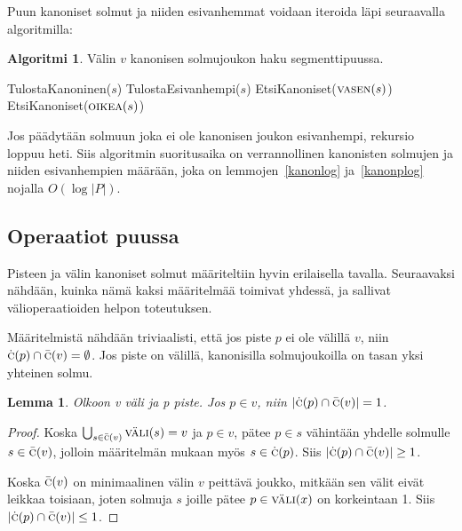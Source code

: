 \documentclass[finnish]{tktltiki2}
\newtheorem{lem}[lau]{Lemma}
\theoremstyle{definition}
\newtheorem{alg}[lau]{Algoritmi}
\theoremstyle{remark}
\newcommand\size[1]{\ensuremath{\left |#1\right |}\xspace}
\newcommand\epts{\ensuremath{P}\xspace}
\newcommand\inter[1]{\ensuremath{\textsc{väli}(#1)}\xspace}
\newcommand\leftc[1]{\ensuremath{\textsc{vasen}(#1)}\xspace}
\newcommand\rightc[1]{\ensuremath{\textsc{oikea}(#1)}\xspace}
\newcommand\canon[1]{\ensuremath{\bar{\textsc{c}}(#1)}\xspace}
\newcommand\canonp[1]{\ensuremath{\dot{\textsc{c}}(#1)}\xspace}
\begin{document}
Puun kanoniset solmut ja niiden esivanhemmat voidaan iteroida läpi seuraavalla algoritmilla:

\begin{alg}\label{alg:seghaku}
Välin $v$ kanonisen solmujoukon haku segmenttipuussa.
\begin{algorithmic}
	\If{$\inter{s}\subseteq v$}
		\State TulostaKanoninen($s$)
	\ElsIf{$\inter{s}\cap v\neq\emptyset$}
		\State TulostaEsivanhempi($s$)
		\State EtsiKanoniset($\leftc{s}$)
		\State EtsiKanoniset($\rightc{s}$)
	\EndIf
\EndProcedure
\end{algorithmic}
\end{alg}

Jos päädytään solmuun joka ei ole kanonisen joukon esivanhempi, rekursio loppuu heti.
Siis algoritmin suoritusaika on verrannollinen kanonisten solmujen ja niiden esivanhempien määrään, joka on lemmojen~\ref{kanonlog} ja~\ref{kanonplog} nojalla $O(\log\size{\epts})$.

\subsection{Operaatiot puussa}

Pisteen ja välin kanoniset solmut määriteltiin hyvin erilaisella tavalla.
Seuraavaksi nähdään, kuinka nämä kaksi määritelmää toimivat yhdessä, ja sallivat välioperaatioiden helpon toteutuksen.

Määritelmistä nähdään triviaalisti, että jos piste $p$ ei ole välillä $v$, niin $\canonp{p}\cap\canon{v}=\emptyset$. Jos piste on välillä, kanonisilla solmujoukoilla on tasan yksi yhteinen solmu.

\begin{lem}\label{leikkaus1}
Olkoon v väli ja p piste. Jos $p\in v$, niin $\size{\canonp{p}\cap\canon{v}}=1$.\end{lem}
\begin{proof}
Koska $\bigcup_{s\in\canon{v}}\inter{s}=v$ ja $p\in v$, pätee $p\in s$ vähintään yhdelle solmulle $s\in\canon{v}$, jolloin määritelmän mukaan myös $s\in\canonp{p}$.
Siis $\size{\canonp{p}\cap\canon{v}}\ge 1$.

Koska $\canon{v}$ on minimaalinen välin $v$ peittävä joukko, mitkään sen välit eivät leikkaa toisiaan, joten solmuja $s$ joille pätee $p\in\inter{x}$ on korkeintaan 1.
Siis $\size{\canonp{p}\cap\canon{v}}\le 1$.
\end{proof}
\end{document}
